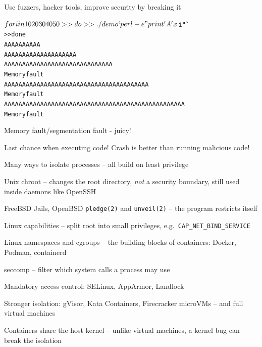 \documentclass[Screen16to9,17pt]{foils}
\begin{document}
{\small {}}





\centerline{Use fuzzers, hacker tools, improve security by breaking it}



\begin{alltt}
$ for i in 10 20 30 40 50
>> do
>> ./demo `perl -e "print 'A'x$i"`
>> done
AAAAAAAAAA
AAAAAAAAAAAAAAAAAAAA
AAAAAAAAAAAAAAAAAAAAAAAAAAAAAA
Memory fault
AAAAAAAAAAAAAAAAAAAAAAAAAAAAAAAAAAAAAAAA
Memory fault
AAAAAAAAAAAAAAAAAAAAAAAAAAAAAAAAAAAAAAAAAAAAAAAAAA
Memory fault
\end{alltt}

\centerline{Memory fault/segmentation fault - juicy!}





\centerline{Last chance when executing code! Crash is better than running malicious code!}


\begin{list1}
\item Many ways to isolate processes -- all build on least privilege
\begin{list2}
\item Unix chroot -- changes the root directory, \emph{not} a security boundary, still used inside daemons like OpenSSH
\item FreeBSD Jails, OpenBSD \verb+pledge(2)+ and \verb+unveil(2)+ -- the program restricts itself
\item Linux capabilities -- split root into small privileges, e.g.\ \verb+CAP_NET_BIND_SERVICE+
\item Linux namespaces and cgroups -- the building blocks of containers: Docker, Podman, containerd
\item seccomp -- filter which system calls a process may use
\item Mandatory access control: SELinux, AppArmor, Landlock
\item Stronger isolation: gVisor, Kata Containers, Firecracker microVMs -- and full virtual machines
\end{list2}
\item Containers share the host kernel -- unlike virtual machines, a kernel bug can break the isolation
\end{list1}
\end{document}
